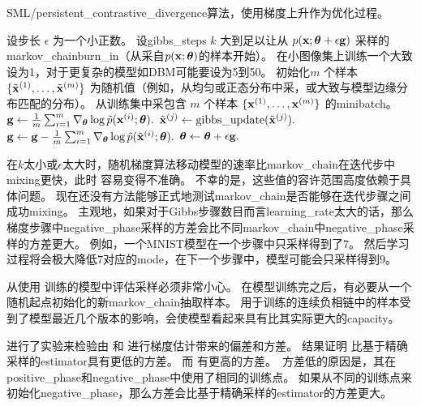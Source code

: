 \begin{algorithm}[ht]
\caption{\gls{SML}/\gls{persistent_contrastive_divergence}算法，使用梯度上升作为优化过程。}
\label{alg:sml}
\begin{algorithmic}
\STATE 设步长 $\epsilon$ 为一个小正数。
\STATE 设\gls{gibbs_steps} $k$ 大到足以让从 $p(\mathbf{x}; \boldsymbol{\theta} + \epsilon \mathbf{g})$ 采样的\gls{markov_chain}\gls{burn_in}（从采自$p(\mathbf{x}; \boldsymbol{\theta})$的样本开始）。
在小图像集上训练一个大致设为1，对于更复杂的模型如\gls{DBM}可能要设为5到50。
\STATE  初始化$m$ 个样本 $\{ \tilde{\mathbf{x}}^{(1)}, \dots, \tilde{\mathbf{x}}^{(m)} \}$ 为随机值（例如，从均匀或正态分布中采，或大致与模型边缘分布匹配的分布）。
\STATE 从训练集中采包含 $m$ 个样本 $\{ \mathbf{x}^{(1)}, \dots, \mathbf{x}^{(m)}\}$ 的\gls{minibatch}。
\STATE $\mathbf{g} \leftarrow \frac{1}{m} \sum_{i=1}^m \nabla_{\boldsymbol{\theta}} \log \tilde{p}(\mathbf{x}^{(i)}; \boldsymbol{\theta}).$
        \STATE $\tilde{\mathbf{x}}^{(j)} \leftarrow \text{gibbs\_update}(\tilde{\mathbf{x}}^{(j)}).$
    \ENDFOR
\ENDFOR
\STATE $\mathbf{g} \leftarrow \mathbf{g} - \frac{1}{m} \sum_{i=1}^m \nabla_{\boldsymbol{\theta}} \log \tilde{p}( \tilde{\mathbf{x}}^{(i)} ; \boldsymbol{\theta} ).$
\STATE $\boldsymbol{\theta} \leftarrow \boldsymbol{\theta} + \epsilon \mathbf{g}.$
\ENDWHILE
\end{algorithmic}
\end{algorithm}

在$k$太小或$\epsilon$太大时，随机梯度算法移动模型的速率比\gls{markov_chain}在迭代步中\gls{mixing}更快，此时\,\,容易变得不准确。
不幸的是，这些值的容许范围高度依赖于具体问题。
现在还没有方法能够正式地测试\gls{markov_chain}是否能够在迭代步骤之间成功\gls{mixing}。
主观地，如果对于Gibbs步骤数目而言\gls{learning_rate}太大的话，那么
梯度步骤中\gls{negative_phase}采样的方差会比不同\gls{markov_chain}中\gls{negative_phase}采样的方差更大。
例如，一个MNIST模型在一个步骤中只采样得到了$7$。
然后学习过程将会极大降低$7$对应的\gls{mode}，在下一个步骤中，模型可能会只采样得到$9$。

从使用\,\,训练的模型中评估采样必须非常小心。
在模型训练完之后，有必要从一个随机起点初始化的新\gls{markov_chain}抽取样本。
用于训练的连续负相链中的样本受到了模型最近几个版本的影响，会使模型看起来具有比其实际更大的\gls{capacity}。



\cite{BerglundR13}进行了实验来检验由\,\,和\,\,进行梯度估计带来的偏差和方差。
结果证明\,\,比基于精确采样的\gls{estimator}具有更低的方差。
而\,\,有更高的方差。
\,方差低的原因是，其在\gls{positive_phase}和\gls{negative_phase}中使用了相同的训练点。
如果从不同的训练点来初始化\gls{negative_phase}，那么方差会比基于精确采样的\gls{estimator}的方差更大。


